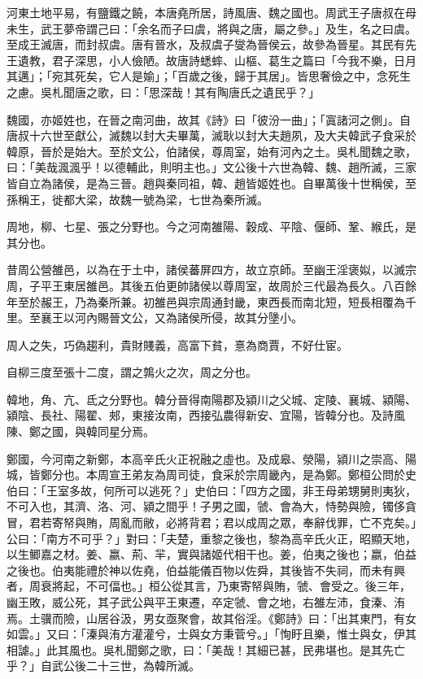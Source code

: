 \begin{pinyinscope}
河東土地平易，有鹽鐵之饒，本唐堯所居，詩風唐、魏之國也。周武王子唐叔在母未生，武王夢帝謂己曰：「余名而子曰虞，將與之唐，屬之參。」及生，名之曰虞。至成王滅唐，而封叔虞。唐有晉水，及叔虞子燮為晉侯云，故參為晉星。其民有先王遺教，君子深思，小人儉陋。故唐詩蟋蟀、山樞、葛生之篇曰「今我不樂，日月其邁」；「宛其死矣，它人是媮」；「百歲之後，歸于其居」。皆思奢儉之中，念死生之慮。吳札聞唐之歌，曰：「思深哉！其有陶唐氏之遺民乎？」

魏國，亦姬姓也，在晉之南河曲，故其《詩》曰「彼汾一曲」；「寘諸河之側」。自唐叔十六世至獻公，滅魏以封大夫畢萬，滅耿以封大夫趙夙，及大夫韓武子食采於韓原，晉於是始大。至於文公，伯諸侯，尊周室，始有河內之土。吳札聞魏之歌，曰：「美哉渢渢乎！以德輔此，則明主也。」文公後十六世為韓、魏、趙所滅，三家皆自立為諸侯，是為三晉。趙與秦同祖，韓、趙皆姬姓也。自畢萬後十世稱侯，至孫稱王，徙都大梁，故魏一號為梁，七世為秦所滅。

周地，柳、七星、張之分野也。今之河南雒陽、穀成、平陰、偃師、鞏、緱氏，是其分也。

昔周公營雒邑，以為在于土中，諸侯蕃屏四方，故立京師。至幽王淫褒姒，以滅宗周，子平王東居雒邑。其後五伯更帥諸侯以尊周室，故周於三代最為長久。八百餘年至於赧王，乃為秦所兼。初雒邑與宗周通封畿，東西長而南北短，短長相覆為千里。至襄王以河內賜晉文公，又為諸侯所侵，故其分墬小。

周人之失，巧偽趨利，貴財賤義，高富下貧，憙為商賈，不好仕宦。

自柳三度至張十二度，謂之鶉火之次，周之分也。

韓地，角、亢、氐之分野也。韓分晉得南陽郡及潁川之父城、定陵、襄城、潁陽、潁陰、長社、陽翟、郟，東接汝南，西接弘農得新安、宜陽，皆韓分也。及詩風陳、鄭之國，與韓同星分焉。

鄭國，今河南之新鄭，本高辛氏火正祝融之虛也。及成皋、滎陽，潁川之崇高、陽城，皆鄭分也。本周宣王弟友為周司徒，食采於宗周畿內，是為鄭。鄭桓公問於史伯曰：「王室多故，何所可以逃死？」史伯曰：「四方之國，非王母弟甥舅則夷狄，不可入也，其濟、洛、河、潁之間乎！子男之國，虢、會為大，恃勢與險，镯侈貪冒，君若寄帑與賄，周亂而敝，必將背君；君以成周之眾，奉辭伐罪，亡不克矣。」公曰：「南方不可乎？」對曰：「夫楚，重黎之後也，黎為高辛氏火正，昭顯天地，以生鲫嘉之材。姜、嬴、荊、羋，實與諸姬代相干也。姜，伯夷之後也；嬴，伯益之後也。伯夷能禮於神以佐堯，伯益能儀百物以佐舜，其後皆不失祠，而未有興者，周衰將起，不可偪也。」桓公從其言，乃東寄帑與賄，虢、會受之。後三年，幽王敗，威公死，其子武公與平王東遷，卒定虢、會之地，右雒左沛，食溱、洧焉。土骥而險，山居谷汲，男女亟聚會，故其俗淫。《鄭詩》曰：「出其東門，有女如雲。」又曰：「溱與洧方灌灌兮，士與女方秉菅兮。」「恂盱且樂，惟士與女，伊其相謔。」此其風也。吳札聞鄭之歌，曰：「美哉！其細已甚，民弗堪也。是其先亡乎？」自武公後二十三世，為韓所滅。


\end{pinyinscope}
